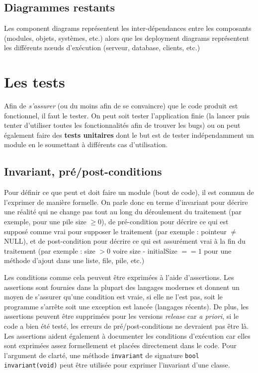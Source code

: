 \documentclass{article}
\begin{document}
	\subsection{Diagrammes restants}
		Les component diagrams représentent les inter-dépendances entre les composants (modules, objets, systèmes, etc.) alors que les deployment diagrams représentent les différents nœuds d'exécution
		(serveur, database, clients, etc.)
	
\section{Les tests}
	Afin de \textit{s'assurer} (ou du moins afin de se convaincre) que le code produit est fonctionnel, il faut le tester. On peut soit tester l'application finie (la lancer puis tenter d'utiliser
	toutes les fonctionnalités afin de trouver les bugs) ou on peut également faire des \textbf{tests unitaires} dont le but est de tester indépendamment un module en le soumettant à différents cas
	d'utilisation.

	\subsection{Invariant, pré/post-conditions}
		Pour définir ce que peut et doit faire un module (bout de code), il est commun de l'exprimer de manière formelle. On parle donc en terme d'invariant pour décrire une réalité qui ne change pas
		tout au long du déroulement du traitement (par exemple, pour une pile size $\geq 0$), de pré-condition pour décrire ce qui est supposé comme vrai pour supposer le traitement (par exemple :
		pointeur $\neq$ NULL), et de post-condition pour décrire ce qui est assurément vrai à la fin du traitement (par exemple : size $> 0$ voire size - initialSize $== 1$ pour une méthode d'ajout
		dans une liste, file, pile, etc.)

		Les conditions comme cela peuvent être exprimées à l'aide d'assertions. Les assertions sont fournies dans la plupart des langages modernes et donnent un moyen de s'assurer qu'une condition est
		vraie, si elle ne l'est pas, soit le programme s'arrête soit une exception est lancée (langages récents). De plus, les assertions peuvent être supprimées pour les versions \textit{release} car
		\textit{a priori}, si le code a bien été testé, les erreurs de pré/post-conditions ne devraient pas être là. Les assertions aident également à documenter les conditions d'exécution car elles
		sont exprimées assez formellement et placées directement dans le code. Pour l'argument de clarté, une méthode \texttt{invariant} de signature \texttt{bool invariant(void)} peut être utilisée
		pour exprimer l'invariant d'une classe.
	
\end{document}
